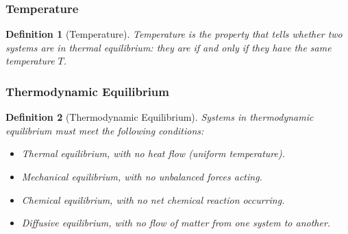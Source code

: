 \documentclass{article}
\newtheorem{definition}{Definition}
\begin{document}
\subsubsection{Temperature}
\begin{definition}[Temperature]
    Temperature is the property that tells whether two systems are in thermal equilibrium: they are if and only if they have the same temperature $T$.
\end{definition}

\subsubsection{Thermodynamic Equilibrium}
\begin{definition}[Thermodynamic Equilibrium]
    Systems in thermodynamic equilibrium must meet the following conditions:
    \begin{itemize}
        \item Thermal equilibrium, with no heat flow (uniform temperature).
        \item Mechanical equilibrium, with no unbalanced forces acting.
        \item Chemical equilibrium, with no net chemical reaction occurring.
        \item Diffusive equilibrium, with no flow of matter from one system to another.
    \end{itemize}
\end{definition}
\end{document}
